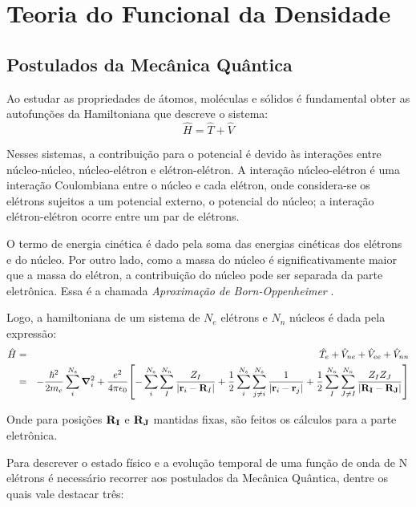 \chapter{Teoria do Funcional da Densidade \label{provas}}

\section{Postulados da Mecânica Quântica\label{meq}}

Ao estudar as propriedades de átomos, moléculas e sólidos é fundamental obter as autofunções da Hamiltoniana que descreve o sistema:
\begin{equation}
	\hat{H}=\hat{T}+\hat{V}
\end{equation}

Nesses sistemas, a contribuição para o potencial é devido às interações entre núcleo-núcleo, núcleo-elétron e elétron-elétron. A interação núcleo-elétron é uma interação Coulombiana entre o núcleo e cada elétron, onde considera-se os elétrons sujeitos a um potencial externo, o potencial do núcleo; a interação elétron-elétron ocorre entre um par de elétrons.

O termo de energia cinética é dado pela soma das energias cinéticas dos elétrons e do núcleo. Por outro lado, como a massa do núcleo é significativamente maior que a massa do elétron, a contribuição do núcleo pode ser separada da parte eletrônica. Essa é a chamada  \textit{Aproximação de Born-Oppenheimer} \cite{material_1}.

Logo, a hamiltoniana de um sistema de $ N_e $ elétrons e $ N_n $ núcleos é dada pela expressão:
\begin{eqnarray}\label{eq:ham_complete}
	\hat{H} &=& \hat{T}_{e}+\hat{V}_{ne}+\hat{V}_{ee}+\hat{V}_{nn}  \\
	&=& -\frac{\hbar^2}{2m_e}\sum_{i}^{N_e} \grad^2_i+\frac{e^2}{4\pi \epsilon_0}\bqty{-\sum_{i}^{N_e}\sum_{I}^{N_n} \frac{Z_I}{\abs{\vb{r}_i-\vb{R}_I}} +\frac{1}{2}\sum_{i}^{N_e}\sum_{j\neq i}^{N_e}\frac{1}{\abs{ \vb{r}_i-\vb{r}_j}} +\frac{1}{2}\sum_{I}^{N_n}\sum_{J\neq I}^{N_n}\frac{Z_I Z_J}{\abs{\vb{R_I}-\vb{R_J}}}}  \nonumber
\end{eqnarray}

Onde para posições $ \vb{R_I}$ e $ \vb{R_J} $ mantidas fixas, são feitos os cálculos para a parte eletrônica.

Para descrever o estado físico e a evolução temporal de uma função de onda de N elétrons é necessário recorrer aos postulados da Mecânica Quântica, dentre os quais vale destacar três:

